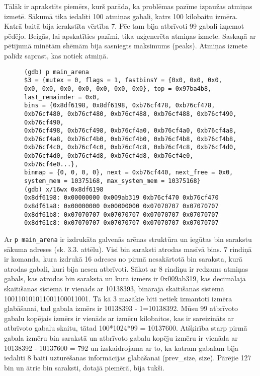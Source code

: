 Tālāk ir aprakstīts piemērs, kurš parāda, ka problēmas pazīme izpaužas atmiņas izmetē.
Sākumā tika iedalīti 100 atmiņas gabali, katrs 100 kilobaitu izmēra.
Katrā baitā bija ierakstīta vērtība 7.
Pēc tam bija atbrīvoti 99 gabali izņemot pēdējo.
Beigās, lai apskatīties pazīmi, tika uzģenerēta atmiņas izmete.
Saskaņā ar pētījumā minētām shēmām \cite{PWMS}  bija sasniegts maksimums (peaks).
Atmiņas izmete palīdz saprast, kas notiek atmiņā.
\begin{figure}[h]
\begin{lstlisting}[style=customgdb]
(gdb) p main_arena
$3 = {mutex = 0, flags = 1, fastbinsY = {0x0, 0x0, 0x0, 0x0, 0x0, 0x0, 0x0, 0x0, 0x0, 0x0}, top = 0x97ba4b8, last_remainder = 0x0,
bins = {0x8df6198, 0x8df6198, 0xb76cf478, 0xb76cf478, 0xb76cf480, 0xb76cf480, 0xb76cf488, 0xb76cf488, 0xb76cf490, 0xb76cf490,
0xb76cf498, 0xb76cf498, 0xb76cf4a0, 0xb76cf4a0, 0xb76cf4a8, 0xb76cf4a8, 0xb76cf4b0, 0xb76cf4b0, 0xb76cf4b8, 0xb76cf4b8,
0xb76cf4c0, 0xb76cf4c0, 0xb76cf4c8, 0xb76cf4c8, 0xb76cf4d0, 0xb76cf4d0, 0xb76cf4d8, 0xb76cf4d8, 0xb76cf4e0, 0xb76cf4e0...},
binmap = {0, 0, 0, 0}, next = 0xb76cf440, next_free = 0x0, system_mem = 10375168, max_system_mem = 10375168}
(gdb) x/16wx 0x8df6198
0x8df6198: 0x00000000 0x009ab319 0xb76cf470 0xb76cf470
0x8df61a8: 0x00000000 0x00000000 0x07070707 0x07070707
0x8df61b8: 0x07070707 0x07070707 0x07070707 0x07070707
0x8df61c8: 0x07070707 0x07070707 0x07070707 0x07070707
\end{lstlisting}
\caption{\textbf{\fontsize{11}{12}\selectfont {bin saraksta izdruka, izmantojot atmiņas izmeti}}}
\end{figure}
Ar \texttt{p main\_arena} ir izdrukāta galvenās arēnas struktūra un iegūtas bin sarakstu sākuma adreses (sk. 3.3. attēlu).
Visi bin saraksti atrodas masīvā bins.
7 rindiņā ir komanda, kura izdrukā 16 adreses no pirmā nesakārtotā bin saraksta, kurā atrodas gabali, kuri bija nesen atbrīvoti.
Sākot ar 8 rindiņu ir redzams atmiņas gabals, kas atrodas bin sarakstā un kura izmērs ir 0x009ab319, kas decimālajā skaitīšanas sistēmā ir vienāds ar 10138393, binārajā skaitīšanas sistēmā 100110101011001100011001.
Tā kā 3 mazākie biti netiek izmantoti izmēra glabāšanai, tad gabala izmērs ir 10138393 - 1=10138392.
Mūsu 99 atbrīvoto gabalu kopējais izmērs ir vienāds ar izmēru kilobaitos, kas ir sareizināts ar atbrīvoto gabalu skaitu, tātad 100*1024*99 = 10137600.
Atšķirība starp pirmā gabala izmēru bin sarakstā un atbrīvoto gabalu kopēju izmēru ir vienāda ar 10138392 - 10137600 = 792 un izskaidrojama ar to, ka katram gabalam bija iedalīti 8 baiti uzturēšanas informācijas glabāšanai (prev\_size, size).
Pārējie 127 bin un ātrie bin saraksti, dotajā piemērā, bija tukši.


